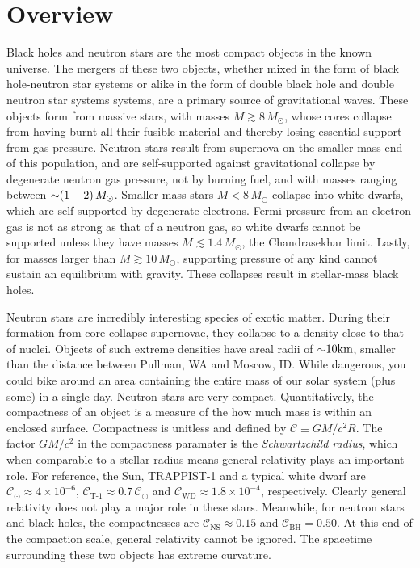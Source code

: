 \chapter{Overview}
\label{chap:chapter-1}


Black holes and neutron stars are the most compact objects in the known universe.  
The mergers of these two objects,
 whether mixed in the form of black hole-neutron star systems or alike in the form of double black hole and double neutron star systems systems,
 are a primary source of gravitational waves.  
These objects form from massive stars,
 with masses $M\gtrsim 8\,M_{\odot}$,
 whose cores collapse from having burnt all their fusible material and thereby
 losing essential support from gas pressure.
Neutron stars result from supernova on the smaller-mass end of this population,
 and are self-supported against gravitational collapse by degenerate neutron gas pressure,
 not by burning fuel,
 and with masses ranging between $\mathord{\sim} (1-2)\,M_{\odot}$.
Smaller mass stars $M < 8\, M_\odot$ collapse into white dwarfs,
 which are self-supported by degenerate electrons.  
Fermi pressure from an electron gas is not as strong as that of a neutron gas,
 so white dwarfs cannot be supported unless they have masses $M\lesssim 1.4\,M_{\odot}$,
 the Chandrasekhar limit.  
Lastly, for masses larger than $M\gtrsim 10\,M_{\odot}$,
 supporting pressure of any kind cannot sustain an equilibrium with gravity.  
These collapses result in stellar-mass black holes.

Neutron stars are incredibly interesting species of exotic matter. 
During their formation from core-collapse supernovae,
 they collapse to a density close to that of nuclei.
Objects of such extreme densities have areal radii of $\mathord{\sim} 10 \textrm{km}$,
 smaller than the distance between Pullman, WA and Moscow, ID.
While dangerous, 
 you could bike around an area containing the entire mass of our solar system (plus some) in a single day.
Neutron stars are very compact.
Quantitatively, the compactness of an object is a measure of the how much mass is within an enclosed surface.
Compactness is unitless and defined by $\mathcal{C}\equiv G M/c^2 R$.
The factor $G M/c^2$ in the compactness paramater is the \textit{Schwartzchild radius},
 which when comparable to a stellar radius means general relativity plays an important role.
For reference,
 the Sun, TRAPPIST-1 and a typical white dwarf are
 $\mathcal{C}_{\odot} \approx 4 \times 10^{-6}$,
 $\mathcal{C}_\textrm{T-1} \approx 0.7\,\mathcal{C}_{\odot}$
 and
 $\mathcal{C}_\textrm{WD} \approx 1.8 \times 10^{-4}$,
 respectively.
Clearly general relativity does not play a major role in these stars.
Meanwhile, for neutron stars and black holes, the compactnesses are 
 $\mathcal{C}_\textrm{NS} \approx 0.15$
 and
 $\mathcal{C}_\textrm{BH} = 0.50$.
At this end of the compaction scale, general relativity cannot be ignored.  The spacetime surrounding these two objects has extreme curvature.

